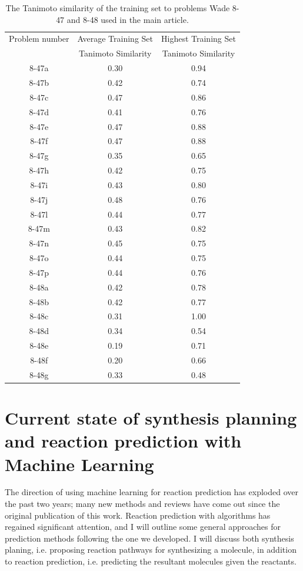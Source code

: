 \begin{table}[ht]\label{tab:problem_training_similarity}
\centering
\caption{The Tanimoto similarity of the training set to problems Wade 8-47 and 8-48 used in the main article.} 
\begin{tabular}{|c|c|c|}
\hline 
 Problem number & Average Training Set & Highest Training Set \\ 
  & Tanimoto Similarity & Tanimoto Similarity \\ 
\hline 
8-47a&0.30&0.94\\
8-47b&0.42&0.74\\
8-47c&0.47&0.86\\
8-47d&0.41&0.76\\
8-47e&0.47&0.88\\
8-47f&0.47&0.88\\
8-47g&0.35&0.65\\
8-47h&0.42&0.75\\
8-47i&0.43&0.80\\
8-47j&0.48&0.76\\
8-47l&0.44&0.77\\
8-47m&0.43&0.82\\
8-47n&0.45&0.75\\
8-47o&0.44&0.75\\
8-47p&0.44&0.76\\
\hline
8-48a&0.42&0.78\\
8-48b&0.42&0.77\\
8-48c&0.31&1.00\\
8-48d&0.34&0.54\\
8-48e&0.19&0.71\\
8-48f&0.20&0.66\\
8-48g&0.33&0.48\\
\hline
\end{tabular}
\end{table}


\section{Current state of synthesis planning and reaction prediction with Machine Learning}

The direction of using machine learning for reaction prediction has exploded over the past two years; many new methods and reviews have come out since the original publication of this work\cite{segler2018planning,coley2018machine,feng2018computational}. Reaction prediction with algorithms has regained significant attention, and I will outline some general approaches for prediction methods following the one we developed. I will discuss both synthesis planing, i.e. proposing reaction pathways for synthesizing a molecule, in addition to reaction prediction, i.e. predicting the resultant molecules given the reactants.

